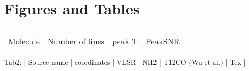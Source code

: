 \section{Figures and Tables}
\begin{table}
\caption{}
\begin{tabular}{|c|c|c|c|}
Molecule & Number of lines & peak T & PeakSNR\\
\end{tabular}
\end{table}

 Tab2: | Source name | coordinates | VLSR | NH2 | T12CO (Wu et al.) | Tex | 

 
  
  
  
  
  
  
  
  
  
  
  
  
  
  